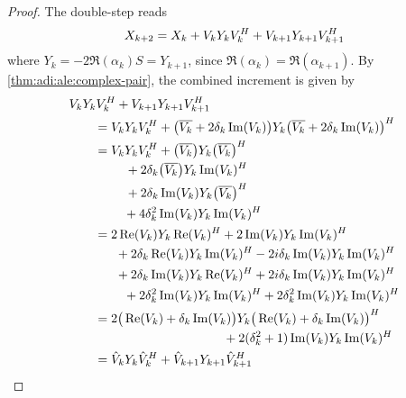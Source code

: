 \begin{proof}
  The double-step reads
  \begin{equation*}
    X_{k+2} = X_k
    + V_k Y_k V_k^H
    + V_{k+1} Y_{k+1} V_{k+1}^H
  \end{equation*}
  where $Y_k = -2 \Re(\alpha_k) S = Y_{k+1}$,
  since $\Re(\alpha_k) = \Re(\alpha_{k+1})$.
  By \autoref{thm:adi:ale:complex-pair},
  the combined increment is given by
  \begin{align*}
    \MoveEqLeft
    V_k Y_k V_k^\HT + V_{k+1} Y_{k+1} V_{k+1}^\HT
    \\
    &= V_k Y_k V_k^\HT +
    \big( \conj{V_k} + 2\delta_k \Im(V_k) \big)
    Y_k
    \big( \conj{V_k} + 2\delta_k \Im(V_k) \big)^\HT
    \\
    &= \begin{multlined}[t]
      V_k Y_k V_k^\HT
      + \big( \conj{V_k} \big) Y_k \big( \conj{V_k} \big)^\HT
      \\
      + 2\delta_k \big( \conj{V_k} \big) Y_k \Im(V_k)^\HT
      \\
      + 2\delta_k \Im(V_k) Y_k \big( \conj{V_k} \big)^\HT
      \\
      + 4\delta_k^2 \Im(V_k) Y_k \Im(V_k)^\HT
    \end{multlined}
    \\
    &= \begin{multlined}[t]
      2\Re(V_k) Y_k \Re(V_k)^\HT
      + 2 \Im(V_k) Y_k \Im(V_k)^\HT
      \\
      + 2\delta_k \Re(V_k) Y_k \Im(V_k)^\HT
      - 2\im\delta_k \Im(V_k) Y_k \Im(V_k)^\HT
      \\
      + 2\delta_k \Im(V_k) Y_k \Re(V_k)^\HT
      + 2\im\delta_k \Im(V_k) Y_k \Im(V_k)^\HT
      \\
      + 2\delta_k^2 \Im(V_k) Y_k \Im(V_k)^\HT
      + 2\delta_k^2 \Im(V_k) Y_k \Im(V_k)^\HT
    \end{multlined}
    \\
    &= \begin{multlined}[t]
      2 \big( \Re(V_k) + \delta_k \Im(V_k) \big)
      Y_k \big( \Re(V_k) + \delta_k \Im(V_k) \big)^\HT
      \\
      + 2(\delta_k^2 + 1) \Im(V_k) Y_k \Im(V_k)^\HT
    \end{multlined}
    \\
    &= \hat V_k Y_k \hat V_k^\HT
    + \hat V_{k+1} Y_{k+1} \hat V_{k+1}^\HT
  \end{align*}
\end{proof}

